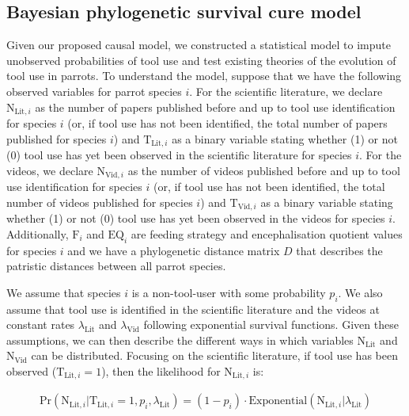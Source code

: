 \documentclass[
  man, donotrepeattitle,floatsintext]{apa6}
\begin{document}
\hypertarget{bayesian-phylogenetic-survival-cure-model}{%
\subsection{Bayesian phylogenetic survival cure model}\label{bayesian-phylogenetic-survival-cure-model}}

Given our proposed causal model, we constructed a statistical model to impute
unobserved probabilities of tool use and test existing theories of the evolution
of tool use in parrots. To understand the model, suppose that we have the
following observed variables for parrot species \(i\). For the scientific
literature, we declare \(\text{N}_{\text{Lit},i}\) as the number of papers
published before and up to tool use identification for species \(i\) (or, if tool
use has not been identified, the total number of papers published for species
\(i\)) and \(\text{T}_{\text{Lit},i}\) as a binary variable stating whether (1) or
not (0) tool use has yet been observed in the scientific literature for species
\(i\). For the videos, we declare \(\text{N}_{\text{Vid},i}\) as the
number of videos published before and up to tool use identification for species
\(i\) (or, if tool use has not been identified, the total number of videos
published for species \(i\)) and \(\text{T}_{\text{Vid},i}\) as a binary variable
stating whether (1) or not (0) tool use has yet been observed in the
videos for species \(i\). Additionally, \(\text{F}_i\) and
\(\text{EQ}_i\) are feeding strategy and encephalisation quotient values for
species \(i\) and we have a phylogenetic distance matrix \(D\) that describes the
patristic distances between all parrot species.

We assume that species \(i\) is a non-tool-user with some
probability \(p_i\). We also assume that tool use is identified in the scientific
literature and the videos at constant rates \(\lambda_{\text{Lit}}\)
and \(\lambda_{\text{Vid}}\) following exponential survival functions. Given these
assumptions, we can then describe the different ways in which variables
\(\text{N}_\text{Lit}\) and \(\text{N}_\text{Vid}\) can be distributed. Focusing on
the scientific literature, if tool use has been observed
(\(\text{T}_{\text{Lit},i} = 1\)), then the likelihood for
\(\text{N}_{\text{Lit},i}\) is:

\begin{align}
\text{Pr}(\text{N}_{\text{Lit},i}|\text{T}_{\text{Lit},i} = 1,p_i,\lambda_\text{Lit}) = (1-p_i)\cdot\text{Exponential}(\text{N}_{\text{Lit},i}|\lambda_\text{Lit})
\end{align}
\end{document}
